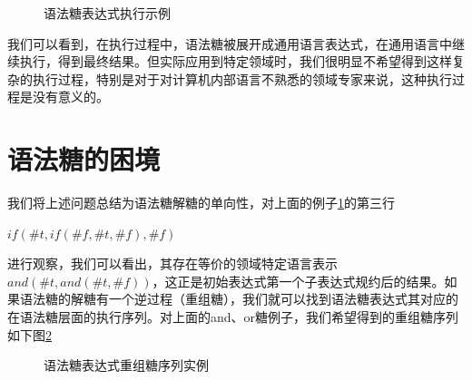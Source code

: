 \begin{figure}[h]
\caption{语法糖表达式执行示例}
\label{fig:desugar}
\end{figure}

我们可以看到，在执行过程中，语法糖被展开成通用语言表达式，在通用语言中继续执行，得到最终结果。但实际应用到特定领域时，我们很明显不希望得到这样复杂的执行过程，特别是对于对计算机内部语言不熟悉的领域专家来说，这种执行过程是没有意义的。


\section{语法糖的困境}
\label{mark:onedirect}我们将上述问题总结为语法糖解糖的单向性，对上面的例子\ref{fig:desugar}的第三行

\begin{flushleft}
	$if(\#t , if(\#f, \#t, \#f), \#f)$
\end{flushleft}
进行观察，我们可以看出，其存在等价的领域特定语言表示$and(\#t, and(\#t, \#f))$，这正是初始表达式第一个子表达式规约后的结果。如果语法糖的解糖有一个逆过程（重组糖），我们就可以找到语法糖表达式其对应的在语法糖层面的执行序列。对上面的and、or糖例子，我们希望得到的重组糖序列如下图\ref{fig:resugar}

\begin{figure}[h]
	\caption{语法糖表达式重组糖序列实例}
	\label{fig:resugar}
\end{figure}

